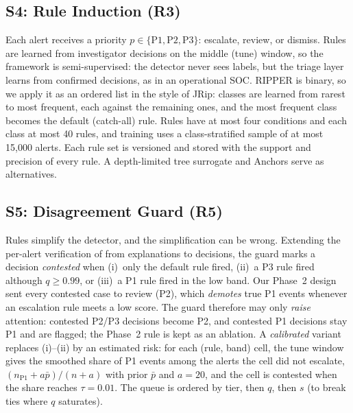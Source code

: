 \documentclass[journal]{IEEEtran}
\begin{document}
\subsection{S4: Rule Induction (R3)}
Each alert receives a priority $p\in\{\text{P1},\text{P2},\text{P3}\}$: escalate, review, or dismiss. Rules are learned from investigator decisions on the middle (tune) window, so the framework is semi-supervised: the detector never sees labels, but the triage layer learns from confirmed decisions, as in an operational SOC. RIPPER \cite{ripper} is binary, so we apply it as an ordered list in the style of JRip: classes are learned from rarest to most frequent, each against the remaining ones, and the most frequent class becomes the default (catch-all) rule. Rules have at most four conditions and each class at most 40 rules, and training uses a class-stratified sample of at most 15{,}000 alerts. Each rule set is versioned and stored with the support and precision of every rule. A depth-limited tree surrogate \cite{trustee} and Anchors \cite{anchors} serve as alternatives.

\subsection{S5: Disagreement Guard (R5)}
Rules simplify the detector, and the simplification can be wrong. Extending the per-alert verification of \cite{excyder} from explanations to decisions, the guard marks a decision \emph{contested} when (i)~only the default rule fired, (ii)~a P3 rule fired although $q\geq 0.99$, or (iii)~a P1 rule fired in the low band. Our Phase~2 design sent every contested case to review (P2), which \emph{demotes} true P1 events whenever an escalation rule meets a low score. The guard therefore may only \emph{raise} attention: contested P2/P3 decisions become P2, and contested P1 decisions stay P1 and are flagged; the Phase~2 rule is kept as an ablation. A \emph{calibrated} variant replaces (i)--(ii) by an estimated risk: for each (rule, band) cell, the tune window gives the smoothed share of P1 events among the alerts the cell did not escalate, $(n_{\text{P1}}+a\bar{p})/(n+a)$ with prior $\bar{p}$ and $a=20$, and the cell is contested when the share reaches $\tau=0.01$. The queue is ordered by tier, then $q$, then $s$ (to break ties where $q$ saturates).
\end{document}
